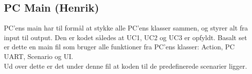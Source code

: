 \subsection{PC Main (Henrik)}
PC'ens main har til formål at stykke alle PC'ens klasser sammen, og styrer alt fra input til output. Den er kodet således at UC1, UC2 og UC3 er opfyldt. Basalt set er dette en main fil som bruger alle funktioner fra PC'ens klasser: Action, PC UART, Scenario og UI.\\
Ud over dette er det under denne fil at koden til de predefinerede scenarier ligger.\\